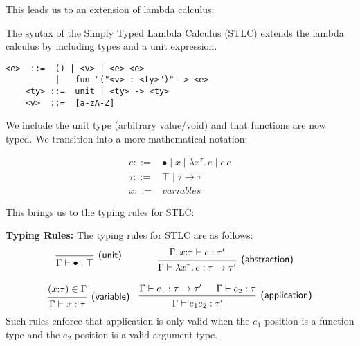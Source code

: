 \noindent 
This leads us to an extension of lambda calculus:
\begin{Def}

    The syntax of the Simply Typed Lambda Calculus (STLC) extends the lambda calculus by including types and a unit expression.
    
    \begin{lstlisting}[numbers=none, mathescape=true]
    <e>  ::=  () | <v> | <e> <e> 
          |   fun "("<v> : <ty>")" -> <e>
    <ty> ::=  unit | <ty> -> <ty>
    <v>  ::=  [a-zA-Z]
    \end{lstlisting}
    
    \noindent
    We include the unit type (arbitrary value/void) and that functions are now typed. We transition into 
    a more mathematical notation:

\[
\begin{array}{ll}
e ::= & \bullet \mid x \mid \lambda x^{\tau}.\, e \mid e\,e \\
\tau ::= & \top \mid \tau \rightarrow \tau \\
x ::= & \textit{variables}
\end{array}
\]

\end{Def}
    


\newpage 
\noindent
This brings us to the typing rules for STLC:


\begin{Def}

    \label{def:stlc-typing-rules}
    \textbf{Typing Rules:} The typing rules for STLC are as follows:
    \[
\begin{array}{cc}
\begin{prooftree}
  \hypo{}
  \infer1[\textsf{(unit)}]{\Gamma \vdash \bullet : \top}
\end{prooftree}
&
\begin{prooftree}
  \hypo{\Gamma, x{:}\tau \vdash e : \tau'}
  \infer1[\textsf{(abstraction)}]{\Gamma \vdash \lambda x^{\tau} .\, e : \tau \rightarrow \tau'}
\end{prooftree}
\\[2em]
\begin{prooftree}
  \hypo{(x{:}\tau) \in \Gamma}
  \infer1[\textsf{(variable)}]{\Gamma \vdash x : \tau}
\end{prooftree}
&
\begin{prooftree}
  \hypo{\Gamma \vdash e_1 : \tau \rightarrow \tau'}
  \hypo{\Gamma \vdash e_2 : \tau}
  \infer2[\textsf{(application)}]{\Gamma \vdash e_1 e_2 : \tau'}
\end{prooftree}
\end{array}
\]
\noindent
Such rules enforce that application is only valid when the $e_1$ position is a function type and the $e_2$ position is a valid argument type.
\end{Def}

